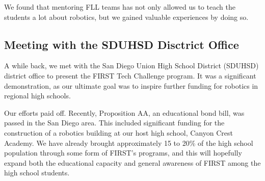 We found that mentoring FLL teams has not only allowed us to teach the students a lot about robotics, but we gained valuable experiences by doing so.


\subsection{Meeting with the SDUHSD Disctrict Office}

A while back, we met with the San Diego Union High School District (SDUHSD) district office to present the FIRST Tech Challenge program. It was a significant demonstration, as our ultimate goal was to inspire further funding for robotics in regional high schools.

Our efforts paid off. Recently, Proposition AA, an educational bond bill, was passed in the San Diego area. This included significant funding for the construction of a robotics building at our host high school, Canyon Crest Academy. We have already brought approximately 15 to 20\% of the high school population through some form of FIRST's programs, and this will hopefully expand both the educational capacity and general awareness of FIRST among the high school students.